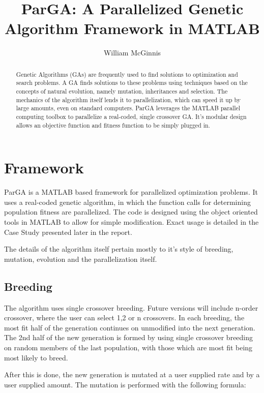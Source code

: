 \documentclass[conference]{IEEEtran}
\title{ParGA: A Parallelized Genetic Algorithm Framework in MATLAB}
\author{William McGinnis}
\begin{document}
\maketitle
\begin{abstract}
Genetic Algorithms (GAs) are frequently used to find solutions to optimization and search problems. A GA finds solutions to these problems using techniques based on the concepts of natural evolution, namely mutation, inheritances and selection.  The mechanics of the algorithm itself lends it to parallelization, which can speed it up by large amounts, even on standard computers.  ParGA leverages the MATLAB parallel computing toolbox to parallelize a real-coded, single crossover GA.  It's modular design allows an objective function and fitness function to be simply plugged in.
\end{abstract}

\section{Framework}

ParGA is a MATLAB based framework for parallelized optimization problems.  It uses a real-coded genetic algorithm, in which the function calls for determining population fitness are parallelized.  The code is designed using the object oriented tools in MATLAB to allow for simple modification.  Exact usage is detailed in the Case Study presented later in the report.

The details of the algorithm itself pertain mostly to it's style of breeding, mutation, evolution and the parallelization itself.  

\subsection{Breeding}

The algorithm uses single crossover breeding.  Future versions will include n-order crossover, where the user can select 1,2 or n crossovers.  In each breeding, the most fit half of the generation continues on unmodified into the next generation.  The 2nd half of the new generation is formed by using single crossover breeding on random members of the last population, with those which are most fit being most likely to breed.

After this is done, the new generation is mutated at a user supplied rate and by a user supplied amount.  The mutation is performed with the following formula:
\end{document}
